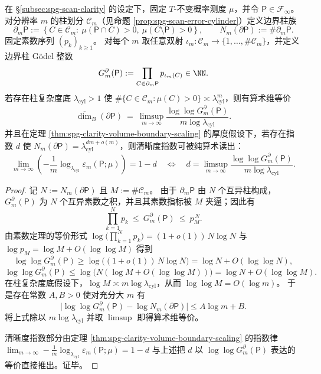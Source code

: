 
\begin{theorem}\label{thm:spg-boundary-cylinder-godelization-clarity}
在 \S\ref{subsec:spg-scan-clarity} 的设定下，固定 \(T\)-不变概率测度 \(\mu\)，并令 \(\mathsf P\in\mathcal F_\infty\)。
对分辨率 \(m\) 的柱划分 \(\mathcal C_m\)（见命题 \ref{prop:spg-scan-error-cylinder}）定义边界柱族
\[
\partial_m\mathsf P
:=\left\{C\in\mathcal C_m:\ \mu(\mathsf P\cap C)>0,\ \mu(C\setminus \mathsf P)>0\right\},
\qquad
N_m(\partial\mathsf P):=\#\partial_m\mathsf P.
\]
固定素数序列 \((p_k)_{k\ge 1}\)。
对每个 \(m\) 取任意双射 \(\iota_m:\mathcal C_m\to \{1,\dots,\#\mathcal C_m\}\)，并定义边界柱 Gödel 整数
\[
G_m^{\partial}(\mathsf P):=\prod_{C\in\partial_m\mathsf P} p_{\iota_m(C)}\in\NN.
\]
若存在柱复杂度底 \(\lambda_{\mathrm{cyl}}>1\) 使 \(\#\{C\in\mathcal C_m:\mu(C)>0\}\asymp \lambda_{\mathrm{cyl}}^m\)，则有算术维等价
\[
\overline{\dim}_B(\partial\mathsf P)
\ =\
\limsup_{m\to\infty}\frac{\log\log G_m^{\partial}(\mathsf P)}{m\log\lambda_{\mathrm{cyl}}}.
\]
并且在定理 \ref{thm:spg-clarity-volume-boundary-scaling} 的厚度假设下，若存在指数 \(d\) 使 \(N_m(\partial\mathsf P)=\lambda_{\mathrm{cyl}}^{dm+o(m)}\)，则清晰度指数可被纯算术读出：
\[
\lim_{m\to\infty}\left(-\frac{1}{m}\log_{\lambda_{\mathrm{cyl}}}\varepsilon_m(\mathsf P;\mu)\right)=1-d
\quad\Longleftrightarrow\quad
d=\limsup_{m\to\infty}\frac{\log\log G_m^{\partial}(\mathsf P)}{m\log\lambda_{\mathrm{cyl}}}.
\]
\end{theorem}
\begin{proof}
记 \(N:=N_m(\partial\mathsf P)\) 且 \(M:=\#\mathcal C_m\)。
由于 \(\partial_m\mathsf P\) 由 \(N\) 个互异柱构成，\(G_m^{\partial}(\mathsf P)\) 为 \(N\) 个互异素数之积，并且其素数指标被 \(M\) 夹逼；因此有
\[
\prod_{k=1}^{N}p_k
\ \le\
G_m^{\partial}(\mathsf P)
\ \le\
p_M^{\,N}.
\]
由素数定理的等价形式
\(
\log\!\bigl(\prod_{k=1}^{N}p_k\bigr)=(1+o(1))\,N\log N
\)
与
\(
\log p_M=\log M+O(\log\log M)
\)
得到
\[
\log\log G_m^{\partial}(\mathsf P)
\ge
\log\!\bigl((1+o(1))\,N\log N\bigr)
=
\log N+O(\log\log N),
\]
\[
\log\log G_m^{\partial}(\mathsf P)
\le
\log\!\bigl(N(\log M+O(\log\log M))\bigr)
=
\log N+O(\log\log M).
\]
在柱复杂度底假设下，\(\log M\asymp m\log\lambda_{\mathrm{cyl}}\)，从而 \(\log\log M=O(\log m)\)。
于是存在常数 \(A,B>0\) 使对充分大 \(m\) 有
\[
\bigl|\log\log G_m^{\partial}(\mathsf P)-\log N_m(\partial\mathsf P)\bigr|
\le
A\log m+B.
\]
将上式除以 \(m\log\lambda_{\mathrm{cyl}}\) 并取 \(\limsup\) 即得算术维等价。
\par
清晰度指数部分由定理 \ref{thm:spg-clarity-volume-boundary-scaling} 的指数律
\(
\lim_{m\to\infty}-\frac1m\log_{\lambda_{\mathrm{cyl}}}\varepsilon_m(\mathsf P;\mu)=1-d
\)
与上述把 \(d\) 以 \(\log\log G_m^{\partial}(\mathsf P)\) 表达的等价直接推出。证毕。
\end{proof}

\endinput
